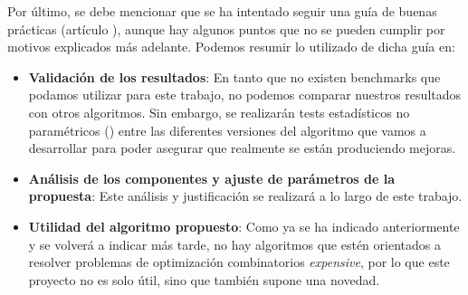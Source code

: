 
Por último, se debe mencionar que se ha intentado seguir una guía de buenas prácticas (artículo \parencite{latorrePrescriptionMethodologicalGuidelines2021}), aunque hay algunos puntos que no se pueden cumplir por motivos explicados más adelante. 
Podemos resumir lo utilizado de dicha guía en: 
\begin{itemize}
	\item \textbf{Validación de los resultados}: 
	En tanto que no existen benchmarks que podamos utilizar para este trabajo, no podemos comparar nuestros resultados con otros algoritmos. 
	Sin embargo, se realizarán tests estadísticos no paramétricos (\parencite{derracPracticalTutorialUse2011}) entre las diferentes versiones del algoritmo que vamos a desarrollar para poder asegurar que realmente se están produciendo mejoras. 
	
	\item \textbf{Análisis de los componentes y ajuste de parámetros de la propuesta}: 
	Este análisis y justificación se realizará a lo largo de este trabajo.
	
	\item \textbf{Utilidad del algoritmo propuesto}: 
	Como ya se ha indicado anteriormente y se volverá a indicar más tarde, no hay algoritmos que estén orientados a resolver problemas de optimización combinatorios \textit{expensive}, por lo que este proyecto no es solo útil, sino que también supone una novedad.
	
\end{itemize}